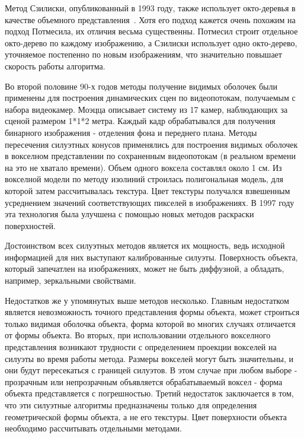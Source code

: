 Метод Сзилиски, опубликованный в 1993 году, также использует окто-деревья в качестве объемного представления~\cite{szeliski}. Хотя его подход кажется очень похожим на подход Потмесила, их отличия весьма существенны. Потмесил строит отдельное окто-дерево по каждому изображению, а Сзилиски использует одно окто-дерево, уточняемое постепенно по новым изображениям, что значительно повышает скорость работы алгоритма.

Во второй половине 90-х годов методы получение видимых оболочек были применены для построения динамических сцен по видеопотокам, получаемым с набора видеокамер. Моэцца описывает систему из 17 камер, наблюдающих за сценой размером 1*1*2 метра. Каждый кадр обрабатывался для получения бинарного изображения - отделения фона и переднего плана. Методы пересечения силуэтных конусов применялись для построения видимых оболочек в вокселном представлении по сохраненным видеопотокам (в реальном времени на это не хватало времени). Объем одного воксела составлял около 1 см. Из вокселной модели по методу изолиний строилась полигональная модель, для которой затем рассчитывалась текстура. Цвет текстуры получался взвешенным усреднением значений соответствующих пикселей в изображениях. В 1997 году эта технология была улучшена с помощью новых методов раскраски поверхностей.

Достоинством всех силуэтных методов является их мощность, ведь исходной информацией для них выступают калиброванные силуэты. Поверхность объекта, который запечатлен на изображениях, может не быть диффузной, а обладать, например, зеркальными свойствами.

Недостатков же у упомянутых выше методов несколько. Главным недостатком является невозможность точного представления формы объекта, может строиться только видимая оболочка объекта, форма которой во многих случаях отличается от формы объекта. Во вторых, при использовании отдельного вокселного представления возникают трудности с определением проекции вокселей на силуэты во время работы метода. Размеры вокселей могут быть значительны, и они будут пересекаться с границей силуэтов. В этом случае при любом выборе - прозрачным или непрозрачным объявляется обрабатываемый воксел - форма объекта представляется с погрешностью. Третий недостаток заключается в том, что эти силуэтные алгоритмы предназначены только для определения геометрической формы объекта, а не его текстуры. Цвет поверхности объекта необходимо рассчитывать отдельными методами. 

